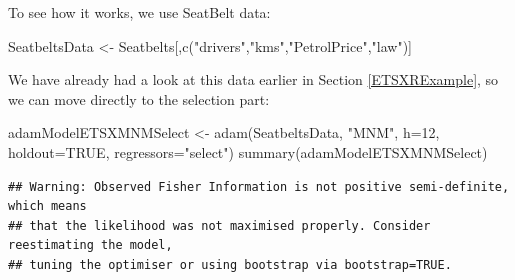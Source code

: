 \documentclass[
]{book}
\newenvironment{Shaded}{\begin{snugshade}}{\end{snugshade}}
\newcommand{\AttributeTok}[1]{\textcolor[rgb]{0.77,0.63,0.00}{#1}}
\newcommand{\ConstantTok}[1]{\textcolor[rgb]{0.00,0.00,0.00}{#1}}
\newcommand{\DecValTok}[1]{\textcolor[rgb]{0.00,0.00,0.81}{#1}}
\newcommand{\FunctionTok}[1]{\textcolor[rgb]{0.00,0.00,0.00}{#1}}
\newcommand{\NormalTok}[1]{#1}
\newcommand{\OtherTok}[1]{\textcolor[rgb]{0.56,0.35,0.01}{#1}}
\newcommand{\StringTok}[1]{\textcolor[rgb]{0.31,0.60,0.02}{#1}}
\theoremstyle{definition}
\theoremstyle{definition}
\theoremstyle{definition}
\theoremstyle{definition}
\theoremstyle{remark}
\begin{document}
To see how it works, we use SeatBelt data:

\begin{Shaded}
\begin{Highlighting}[]
\NormalTok{SeatbeltsData }\OtherTok{\textless{}{-}}\NormalTok{ Seatbelts[,}\FunctionTok{c}\NormalTok{(}\StringTok{"drivers"}\NormalTok{,}\StringTok{"kms"}\NormalTok{,}\StringTok{"PetrolPrice"}\NormalTok{,}\StringTok{"law"}\NormalTok{)]}
\end{Highlighting}
\end{Shaded}

We have already had a look at this data earlier in Section \ref{ETSXRExample}, so we can move directly to the selection part:

\begin{Shaded}
\begin{Highlighting}[]
\NormalTok{adamModelETSXMNMSelect }\OtherTok{\textless{}{-}} \FunctionTok{adam}\NormalTok{(SeatbeltsData, }\StringTok{"MNM"}\NormalTok{,}
                               \AttributeTok{h=}\DecValTok{12}\NormalTok{, }\AttributeTok{holdout=}\ConstantTok{TRUE}\NormalTok{,}
                               \AttributeTok{regressors=}\StringTok{"select"}\NormalTok{)}
\FunctionTok{summary}\NormalTok{(adamModelETSXMNMSelect)}
\end{Highlighting}
\end{Shaded}

\begin{verbatim}
## Warning: Observed Fisher Information is not positive semi-definite, which means
## that the likelihood was not maximised properly. Consider reestimating the model,
## tuning the optimiser or using bootstrap via bootstrap=TRUE.
\end{verbatim}
\end{document}
